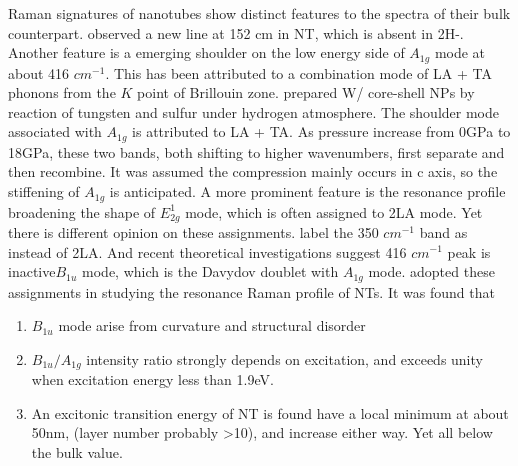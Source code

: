 Raman signatures of  nanotubes show distinct features to the spectra of their bulk counterpart. \citeauthor{JMR7990865} observed a new line at 152 cm in  NT, which is absent in 2H-.\cite{JMR7990865} Another feature is a emerging shoulder on the low energy side of $A_{1g}$ mode at about 416 $cm^{-1}$. This has been attributed to a combination mode of LA + TA phonons from the $K$ point of Brillouin zone.\cite{Sourisseau1991} \citeauthor{Zou2007} prepared W/ core-shell NPs by reaction of tungsten and sulfur under hydrogen atmosphere.\cite{Zou2007} The shoulder mode associated with $A_{1g}$ is attributed to LA + TA. As pressure increase from 0GPa to 18GPa, these two bands, both shifting to higher wavenumbers, first separate and then recombine. It was assumed the compression mainly occurs in c axis, so the stiffening of $A_{1g}$ is anticipated. A more prominent feature is the resonance profile broadening the shape of $E_{2g}^1$ mode, which is often assigned to 2LA mode. Yet there is different opinion on these assignments. \citeauthor{Molina-Sanchez2011} label the 350 $cm^{-1}$ band as  instead of 2LA.\cite{Molina-Sanchez2011} And recent theoretical investigations suggest 416 $cm^{-1}$ peak is inactive$B_{1u}$ mode\cite{Molina-Sanchez2011,Ataca2012}, which is the Davydov doublet with $A_{1g}$ mode. \citeauthor{Staiger2012} adopted these assignments in studying the resonance Raman profile of  NTs.\cite{Staiger2012} It was found that
\begin{enumerate}
\item $B_{1u}$ mode arise from curvature and structural disorder
\item $B_{1u}/A_{1g}$ intensity ratio strongly depends on excitation, and exceeds unity when excitation energy less than 1.9eV.
\item  An excitonic transition energy of NT is found have a local minimum at about 50nm, (layer number probably \textgreater 10), and increase either way. Yet all below the bulk value.
\end{enumerate}

